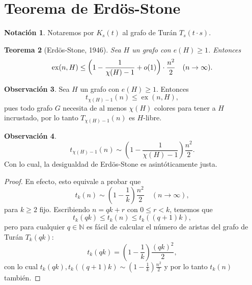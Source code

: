 \documentclass[12pt]{report}
\theoremstyle{plain}
\newtheorem{theorem}{Teorema}[section]
\theoremstyle{definition}
\newtheorem{obs}[theorem]{Observación}
\newtheorem{notation}[theorem]{Notación}
\newcommand{\naturals}{\mathbb{N}}
\newcommand{\ex}[2]{\operatorname{ex} (#1, #2)}
\begin{document}
\section{Teorema de Erdös-Stone}


\begin{notation}
Notaremos por $K_s (t)$ al grafo de Turán $T_{s} (t \cdot s)$.
\end{notation}

\begin{theorem}[Erdös-Stone, 1946]\label{th:teorema de Erdos-stone}
Sea $H$ un grafo con $e(H) \geq 1$. Entonces
\[
    \ex n H \leq \left ( 1 - \frac{1}{\chi (H) - 1}  + o (1) \right) \cdot \frac{n^2}{2} \quad (n \to \infty). \\
\]
\end{theorem}

\begin{obs}
Sea $H$ un grafo con $e(H) \geq 1$. Entonces
\[
    t_{\chi (H) -1} (n) \leq \ex n H,
\]
pues todo grafo $G$ necesita de al menos $\chi (H)$ colores para tener a $H$ incrustado, por lo tanto $T_{\chi (H) - 1} (n)$ es $H$-libre.
\end{obs}

\begin{obs}\label{obs:tenemos que el numero de turan es asintotico a (1-1/r)n2/2}
\[
t_{\chi (H) - 1 } (n) \sim \left ( 1 - \frac{1}{\chi (H)- 1}\right ) \frac{n^2}{2}.
\]
Con lo cual, la desigualdad de Erdös-Stone es asintóticamente justa.
\end{obs}
\begin{proof}
En efecto, esto equivale a probar que
\[
    t_{k} (n) \sim \left (1 - \frac 1 {k} \right ) \frac{n^2}{2} \quad (n \to \infty),
\]
para $k \geq 2$ fijo. Escribiendo $n = q k + r$ con $0 \leq r < k$, tenemos que
\[
    t_k (q k) \leq t_k (n) \leq t_k((q+1)k),
\]
pero para cualquier $q \in \naturals$ es fácil de calcular el número de aristas del grafo de Turán $T_k (q k)$:
\[
    t_k (q k) = \left ( 1 - \frac 1 k \right ) \frac{(q k)^2}{2},
\]
con lo cual $t_k (q k) , t_k ((q+1)k) \sim \left ( 1 - \frac 1 k \right)  \frac {n^2}{2}$ y por lo tanto $t_k (n)$ también.
\end{proof}
\end{document}
